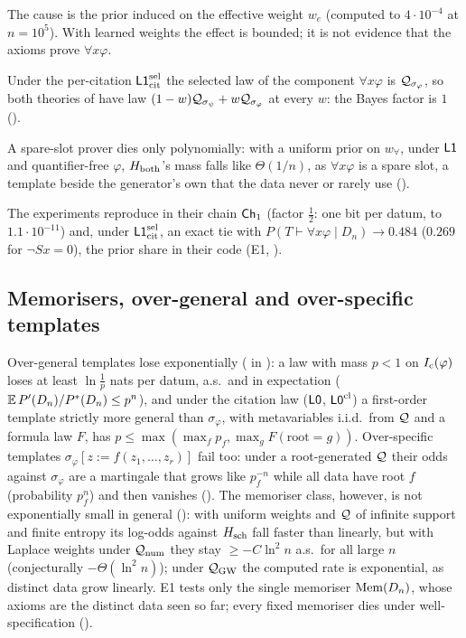 \noindent The cause is the prior induced on the effective weight $w_e$ (computed to $4\cdot10^{-4}$ at $n=10^5$). With learned weights the effect is bounded; it is not evidence that the axioms prove $\forall x\varphi$.

\begin{remark}\label{rem:univ:B2cit}
Under the per-citation $\mathord{\mathsf{L1}}^{\mathrm{sel}}_{\mathrm{cit}}$ the selected law of the component $\forall x\varphi$ is $\mathcal{Q}_{\sigma_\varphi}$, so both theories of  have law $(1-w)\mathcal{Q}_{\sigma_\psi}+w\mathcal{Q}_{\sigma_\varphi}$ at every $w$: the Bayes factor is $1$ ().
\end{remark}

\noindent A spare-slot prover dies only polynomially: with a uniform prior on $w_\forall$, under $\mathord{\mathsf{L1}}$ and quantifier-free $\varphi$, $H_{\mathrm{both}}$'s mass falls like $\Theta(1/n)$, as $\forall x\varphi$ is a spare slot, a template beside the generator's own that the data never or rarely use ().

The experiments reproduce  in their chain $\mathsf{Ch}_{1}$ (factor $\tfrac12$: one bit per datum, to $1.1\cdot10^{-11}$) and, under $\mathord{\mathsf{L1}}^{\mathrm{sel}}_{\mathrm{cit}}$, an exact tie with $P(T\vdash\forall x\varphi\mid D_n)\to0.484$ ($0.269$ for $\neg Sx=0$), the prior share in their code (E1, ).

\subsection{Memorisers, over-general and over-specific templates}\label{sec:univ:memo}

Over-general templates lose exponentially ( in ): a law with mass $p<1$ on $I_{\mathrm{c}}(\varphi)$ loses at least $\ln\frac1p$ nats per datum, a.s.\ and in expectation ($\mathbb{E}\,P'(D_n)/P^*(D_n)\le p^n$), and under the citation law ($\mathord{\mathsf{L0}}$, $\mathord{\mathsf{L0}}^{\mathrm{cl}}$) a first-order template strictly more general than $\sigma_\varphi$, with metavariables i.i.d.\ from $\mathcal{Q}$ and a formula law $F$, has $p\le\max(\max_fp_f,\max_gF(\mathrm{root}=g))$. Over-specific templates $\sigma_\varphi[z:=f(z_1,\dots,z_r)]$ fail too: under a root-generated $\mathcal{Q}$ their odds against $\sigma_\varphi$ are a martingale that grows like $p_f^{-n}$ while all data have root $f$ (probability $p_f^n$) and then vanishes (). The memoriser class, however, is not exponentially small in general (): with uniform weights and $\mathcal{Q}$ of infinite support and finite entropy its log-odds against $H_{\mathrm{sch}}$ fall faster than linearly, but with Laplace weights under $\mathcal{Q}_{\mathrm{num}}$ they stay $\ge-C\ln^2n$ a.s.\ for all large $n$ (conjecturally $-\Theta(\ln^2n)$); under $\mathcal{Q}_{\mathrm{GW}}$ the computed rate is exponential, as distinct data grow linearly. E1 tests only the single memoriser $\mathrm{Mem}(D_n)$, whose axioms are the distinct data seen so far; every fixed memoriser dies under well-specification ().

